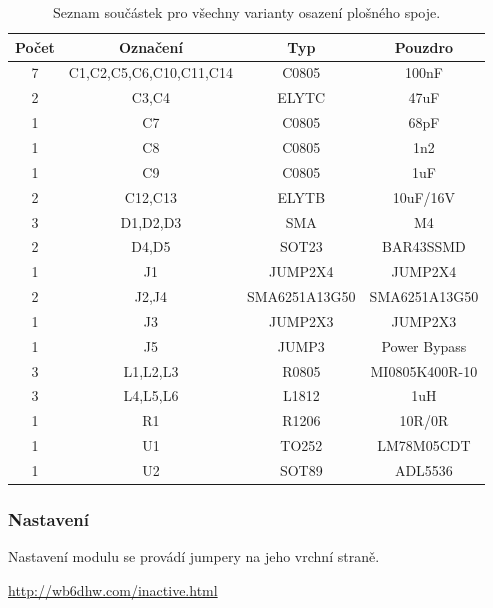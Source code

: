 \documentclass[12pt,a4paper,oneside]{article}
\begin{document}
\begin{savenotes}
\begin{table}[h!]
\begin{center}
\begin{tabular}{ |c|c|c|c| }
\hline 
Počet & Označení & Typ  & Pouzdro  \\ 
\hline 
7	&	C1,C2,C5,C6,C10,C11,C14	&	C0805	&	100nF	\\
2	&	C3,C4	&	ELYTC	&	47uF	\\
1	&	C7	&	C0805	&	68pF	\\
1	&	C8	&	C0805	&	1n2	\\
1	&	C9	&	C0805	&	1uF	\\
2	&	C12,C13	&	ELYTB	&	10uF/16V	\\
3	&	D1,D2,D3	&	SMA	&	M4	\\
2	&	D4,D5	&	SOT23	&	BAR43SSMD	\\
1	&	J1	&	JUMP2X4	&	JUMP2X4	\\
2	&	J2,J4	&	SMA6251A13G50	&	SMA6251A13G50	\\
1	&	J3	&	JUMP2X3	&	JUMP2X3	\\
1	&	J5	&	JUMP3	&	Power Bypass	\\
3	&	L1,L2,L3	&	R0805	&	MI0805K400R-10	\\
3	&	L4,L5,L6	&	L1812	&	1uH	\\
1	&	R1	&	R1206	&	10R/0R	\\
1	&	U1	&	TO252	&	LM78M05CDT	\\
1	&	U2	&	SOT89	&	ADL5536	\\
\hline 
\end{tabular}
\end{center}
\caption{Seznam součástek pro všechny varianty osazení plošného spoje.}
\label{seznam_soucastek}
\end{table}
\end{savenotes}

\newpage

\subsubsection{Nastavení}
Nastavení modulu se provádí jumpery na jeho vrchní straně. 


\begin{thebibliography}{99}
\href{http://wb6dhw.com/inactive.html}{http://wb6dhw.com/inactive.html}

\end{thebibliography}
\end{document}
